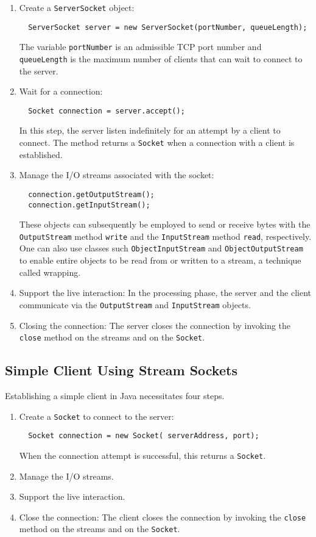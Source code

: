 \documentclass[11pt]{article}
\begin{document}
\begin{enumerate}
\item Create a \texttt{ServerSocket} object:
\begin{verbatim}
  ServerSocket server = new ServerSocket(portNumber, queueLength);
\end{verbatim}
The variable \texttt{portNumber} is an admissible TCP port number and \texttt{queueLength} is the maximum number of clients that can wait to connect to the server.
\item Wait for a connection:
\begin{verbatim}
  Socket connection = server.accept();
\end{verbatim}
In this step, the server listen indefinitely for an attempt by a client to connect.
The method returns a \texttt{Socket} when a connection with a client is established.
\item Manage the I/O streams associated with the socket:
\begin{verbatim}
  connection.getOutputStream();
  connection.getInputStream();
\end{verbatim}
These objects can subsequently be employed to send or receive bytes with the \texttt{OutputStream} method \texttt{write} and the \texttt{InputStream} method \texttt{read}, respectively.
One can also use classes such \texttt{ObjectInputStream} and \texttt{ObjectOutputStream} to enable entire objects to be read from or written to a stream, a technique called wrapping.
\item Support the live interaction:
In the processing phase, the server and the client communicate via the \texttt{OutputStream} and \texttt{InputStream} objects.
\item Closing the connection:
The server closes the connection by invoking the \texttt{close} method on the streams and on the \texttt{Socket}.
\end{enumerate}


\subsection*{Simple Client Using Stream Sockets}

Establishing a simple client in Java necessitates four steps.

\begin{enumerate}
\item Create a \texttt{Socket} to connect to the server:
\begin{verbatim}
  Socket connection = new Socket( serverAddress, port);
\end{verbatim}
When the connection attempt is successful, this returns a \texttt{Socket}.
\item Manage the I/O streams.
\item Support the live interaction.
\item Close the connection:
The client closes the connection by invoking the \texttt{close} method on the streams and on the \texttt{Socket}.
\end{enumerate}
\end{document}
